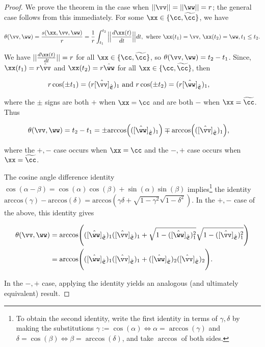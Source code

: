 \begin{proof}
    We prove the theorem in the case when $||\vv|| = ||\ww|| = r$; the general case follows from this immediately. For some $\xx \in \{\cc, \widetilde{\cc}\}$, we have

    \begin{align*}
        \theta(\vv, \ww) = \frac{s(\xx, \vv, \ww)}{r} = \frac{1}{r} \int_{t_1}^{t_2} \Big|\Big| \frac{d\xx(t)}{dt} \Big|\Big| dt, \text{ where $\xx(t_1) = \vv$, $\xx(t_2) = \ww$}, t_1 \leq t_2.
    \end{align*}
    
    We have $||\frac{d\xx(t)}{dt}|| = r$ for all $\xx \in \{\cc, \widetilde{\cc}\}$, so $\theta(\vv, \ww) = t_2 - t_1$. Since, $\xx(t_1) = r \hvv$ and $\xx(t_2) = r \hww$ for all $\xx \in \{\cc, \widetilde{\cc}\}$, then

    \begin{align*}
        {r \cos(\pm t_1) = (r[\hvv]_\sE)_1} &\text{ and } {r \cos(\pm t_2) = (r[\hww]_\sE)_1},
    \end{align*}

    where the $\pm$ signs are both $+$ when $\xx = \cc$ and are both $-$ when $\xx = \widetilde{\cc}$. Thus
   
   \begin{align*}
       \theta(\vv, \ww) = t_2 - t_1 &= \pm \text{arccos}\Big(([\hww]_\sE)_1\Big) \mp \text{arccos}\Big(([\hvv]_\sE)_1\Big),
   \end{align*}

   where the $+, -$ case occurs when $\xx = \cc$ and the $-, +$ case occurs when $\xx = \widetilde{\cc}$.
   
   The cosine angle difference identity $\cos(\alpha - \beta) = \cos(\alpha) \cos(\beta) + \sin(\alpha) \sin(\beta)$ implies\footnote{To obtain the second identity, write the first identity in terms of $\gamma, \delta$ by making the substitutions ${\gamma := \cos(\alpha) \iff \alpha = \arccos(\gamma)}$ and ${\delta = \cos(\beta) \iff \beta = \arccos(\delta)}$, and take $\arccos$ of both sides.} the identity \\ ${\text{arccos}(\gamma) - \text{arccos}(\delta) = \text{arccos}(\gamma \delta + \sqrt{1 - \gamma^2}\sqrt{1 - \delta^2})}$. In the $+, -$ case of the above, this identity gives
   
    \begin{align*}
       \theta(\vv, \ww) &= \text{arccos}\Bigg(([\hww]_\sE)_1 ([\hvv]_\sE)_1 + \sqrt{1 -([\hww]_\sE)_1^2} \sqrt{1 - ([\hvv]_\sE)_1^2} \Bigg) \\
       &= \text{arccos}\Bigg(([\hww]_\sE)_1 ([\hvv]_\sE)_1 + ([\hww]_\sE)_2 ([\hvv]_\sE)_2 \Bigg).
   \end{align*}
   
   In the $-, +$ case, applying the identity yields an analogous (and ultimately equivalent) result.
\end{proof}

